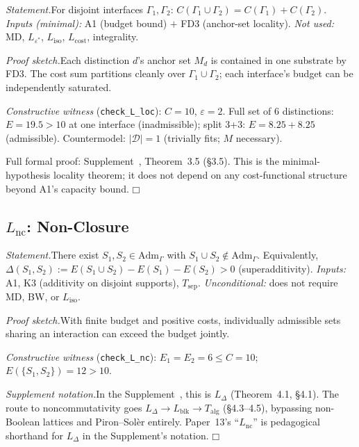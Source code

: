 \documentclass[11pt]{article}
\providecommand{\square}{\ensuremath{\mdlgwhtsquare}}
\newcommand{\Adm}{\mathrm{Adm}}
\newcommand{\eps}{\varepsilon}
\newcommand{\Lnc}{L_{\mathrm{nc}}}
\newcommand{\Lloc}{L_{\mathrm{loc}}}
\begin{document}
\begin{tcolorbox}[apfbox, title={Lemma $\Lloc$ (Locality) --- Statement and Sketch}]
\textit{Statement.}\quad For disjoint interfaces $\Gamma_1, \Gamma_2$: $C(\Gamma_1 \cup \Gamma_2) = C(\Gamma_1) + C(\Gamma_2)$.
\textit{Inputs (minimal):} A1 (budget bound) $+$ FD3 (anchor-set locality).
\textit{Not used:} MD, $L_{\varepsilon^*}$, $L_{\mathrm{iso}}$, $L_{\mathrm{cost}}$, integrality.
\end{tcolorbox}

\noindent\textit{Proof sketch.}\quad Each distinction $d$'s anchor set $M_d$ is contained in one substrate by FD3.  The cost sum partitions cleanly over $\Gamma_1 \cup \Gamma_2$; each interface's budget can be independently saturated.

\textit{Constructive witness} (\texttt{check\_L\_loc}): $C = 10$, $\eps = 2$.  Full set of 6 distinctions: $E = 19.5 > 10$ at one interface (inadmissible); split 3+3: $E = 8.25 + 8.25$ (admissible).  Countermodel: $|\mathcal{D}| = 1$ (trivially fits; $M$ necessary).

Full formal proof: Supplement~\cite{Supp}, Theorem~3.5 (§3.5).  This is the minimal-hypothesis locality theorem; it does not depend on any cost-functional structure beyond A1's capacity bound. \hfill$\square$


\subsection{\texorpdfstring{$L_{\mathrm{nc}}$}{Lnc}: Non-Closure}

\begin{tcolorbox}[apfbox, title={Lemma $\Lnc$ (Non-Closure) --- Statement and Sketch}]
\textit{Statement.}\quad There exist $S_1, S_2 \in \Adm_\Gamma$ with $S_1 \cup S_2 \notin \Adm_\Gamma$.  Equivalently, $\Delta(S_1,S_2) := E(S_1 \cup S_2) - E(S_1) - E(S_2) > 0$ (superadditivity).
\textit{Inputs:} A1, K3 (additivity on disjoint supports), $T_{\mathrm{sep}}$.
\textit{Unconditional:} does not require MD, BW, or $L_{\mathrm{iso}}$.
\end{tcolorbox}

\noindent\textit{Proof sketch.}\quad With finite budget and positive costs, individually admissible sets sharing an interaction can exceed the budget jointly.

\textit{Constructive witness} (\texttt{check\_L\_nc}): $E_1 = E_2 = 6 \le C = 10$; $E(\{S_1,S_2\}) = 12 > 10$.

\textit{Supplement notation.}\quad In the Supplement~\cite{Supp}, this is $L_\Delta$ (Theorem~4.1, §4.1).  The route to noncommutativity goes $L_\Delta \to L_{\mathrm{blk}} \to T_{\mathrm{alg}}$ (§4.3--4.5), bypassing non-Boolean lattices and Piron--Sol\`er entirely.  Paper~13's ``$L_{\mathrm{nc}}$'' is pedagogical shorthand for $L_\Delta$ in the Supplement's notation. \hfill$\square$
\end{document}
